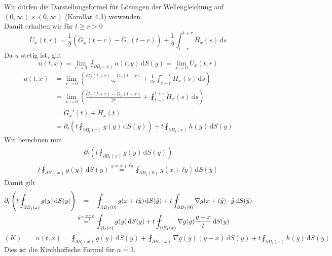 Wir dürfen die Darstellungsformel für Lösungen der Wellengleichung auf $(0,\infty) \times (0,\infty)$ (Korollar 4.3) verwenden. \\
Damit erhalten wir für $t \geq r > 0$
\[
	\tilde U_x(t,r) = \frac{1}{2} ( \tilde G_x(t-r)- \tilde G_x(t-r)) + \frac{1}{2} \int_{t-r}^{t+r} \tilde H_x(s) \,\mathrm{d}s
\]
Da $u$ stetig ist, gilt
\[
	u(t,x)= \lim_{r \to 0} \fint_{\partial B_r(x)}^{} u(t,y) \,\mathrm{d}S(y) = \lim_{r \to 0} U_x(t,r)
\]
\begin{align*}
	u(t,x) &= \lim_{r \to 0} \left( \frac{\tilde G_x(t+r)- \tilde G_x(t-r)}{2 r} + \frac{1}{2r} \int_{t-r}^{t+r} \tilde H_x(s) \,\mathrm{d}s \right) \\
	&= \lim_{r \to 0} \left( \frac{\tilde G_x(t+r) - \tilde G_x(t-r)}{2r} + \fint_{t-r}^{t+r} \tilde H_x(s) \,\mathrm{d}s \right) \\
	&= \tilde G_x'(t) + \tilde H_x(t) \\
	&= \partial_t \left( t \fint_{\partial B_t(x)}^{} g(y) \,\mathrm{d}S(y) \right) + t \fint_{\partial B_t(x)}^{} h(y) \,\mathrm{d}S(y)
\end{align*}
Wir berechnen nun 
\begin{align*}
	\partial_t \left(t \fint_{\partial B_t(x)}^{} g(y) \,\mathrm{d}S(y) \right)
\end{align*}
\begin{align*}
 t \fint_{\partial B_t(x)}^{} g(y) \,\mathrm{d}S(y)
	\stackrel{y= x+t \tilde y}{=} \fint_{\partial B_1(0)}^{} g(x + t \tilde y) \,\mathrm{d}S( \tilde y)
\end{align*}
Damit gilt
\begin{align*}
	\partial_t \left(t \fint_{\partial B_t(x)}^{} g(y) \,\mathrm{d}S(y) \right) & 
	\stackrel{\hphantom{\tilde y = \frac{y-x}{t}}}{=} \fint_{\partial B_1(0)}^{} g(x+t \tilde y) \,\mathrm{d}S( \tilde y) 
	+  t \fint_{\partial B_1(0)}^{}  \nabla g(x + t \tilde y) \cdot \tilde y \,\mathrm{d}S( \tilde y) \\
	& \stackrel{\tilde y = \frac{y-x}{t}}{=} \fint_{B_t(x)}^{} g(y) \,\mathrm{d}S(y) + t \fint_{\partial B_t(x)}^{}  \nabla g(y) \frac{y-x}{t} \,\mathrm{d}S(y)
\end{align*}
\[
	(K) \qquad u(t,x)= \fint_{\partial B_t(x)}^{} g(y) \,\mathrm{d}S(y) + \fint_{\partial B_t(x)}^{}  \nabla g(y) (y-x) \,\mathrm{d}S(y) + t \fint_{\partial B_t(x)}^{} h(y) \,\mathrm{d}S(y)
\]
Dies ist die Kirchhoffsche Formel für $n=3$.

